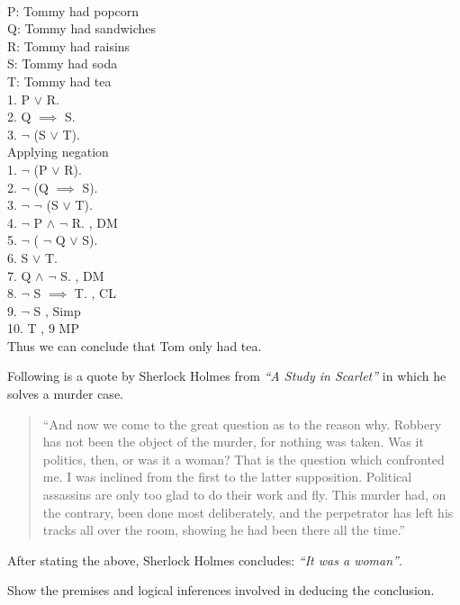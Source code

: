 \documentclass[a4paper]{exam}
\begin{document}
\begin{questions}
  \begin{solution}
  \\
    P: Tommy had popcorn\\
    Q: Tommy had sandwiches\\
    R: Tommy had raisins\\
    S: Tommy had soda\\
    T: Tommy had tea\\
    1. P $\lor$ R.\\
    2. Q $\implies$ S.\\
    3. $\lnot$ (S $\lor$ T).\\
    Applying negation\\
    1. $\lnot$ (P $\lor$ R).\\
    2. $\lnot$ (Q $\implies$ S).\\
    3. $\lnot$ $\lnot$ (S $\lor$ T).\\
    4. $\lnot$ P $\land$ $\lnot$ R.      , DM\\
    5. $\lnot$ ( $\lnot$ Q $\lor$ S).    \\ 
    6. S $\lor$ T.       \;  \\
    7. Q $\land$ $\lnot$ S.       , DM\\
    8. $\lnot$ S $\implies$ T.   , CL\\
    9. $\lnot$ S  , Simp\\
    10. T \; , 9 MP\\
    Thus we can conclude that Tom only had tea.
  \end{solution}

  \question Following is a quote by Sherlock Holmes from \textit{“A Study in Scarlet”} in which he solves a murder case.
\begin{quote}
``And now we come to the great question as to the reason why. Robbery has not been the object of the murder, for nothing was taken. Was it politics, then, or was it a woman? That is the question which confronted me. I was inclined from the first to the latter supposition. Political assassins are only too glad to do their work and fly. This murder had, on the contrary, been done most deliberately, and the perpetrator has left his tracks all over the room, showing he had been there all the time.''
\end{quote}
After stating the above, Sherlock Holmes concludes: \textit{``It was a woman''}.

Show the premises and logical inferences involved in deducing the conclusion.

  \begin{solution}
    

\end{solution}
\end{questions}
\end{document}
